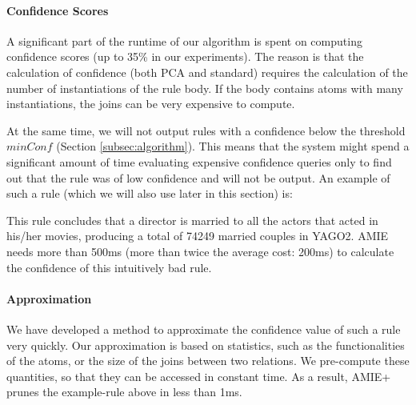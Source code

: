\paragraph{Confidence Scores} A significant part of the runtime of our algorithm is spent on computing confidence scores (up to 35\% in our experiments).
The reason is that the calculation of confidence (both PCA and standard) requires the calculation of the
number of instantiations of the rule body. %
If the body contains atoms with many instantiations, the joins can be very expensive to compute.

At the same time, we will not output rules with a confidence below the threshold $minConf$ (Section \ref{subsec:algorithm}).
This means that the system might spend a significant amount of time evaluating expensive confidence queries only to find out that the rule was of low confidence and will not be output.
An example of such a rule (which we will also use later in this section) is:


\noindent This rule concludes that a director is married to all the actors that acted in his/her movies, producing a total of 74249 married couples in YAGO2.
AMIE needs more than 500ms (more than twice the average cost: 200ms) to calculate the confidence of this intuitively bad rule.


\paragraph{Approximation} We have developed a method to approximate the confidence value of such a rule very quickly.
Our approximation is based on statistics, such as the functionalities of the atoms, or the size of the joins between two relations.
We pre-compute these quantities, so that they can be accessed in constant time. As a result, AMIE+ prunes the example-rule above in less than 1ms.

